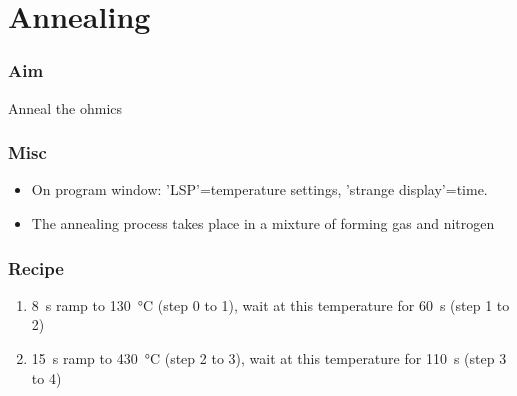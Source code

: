 \documentclass[12pt,a4paper]{report}
\begin{document}
\section{Annealing}
\subsubsection{Aim}
Anneal the ohmics

\subsubsection{Misc}
\begin{itemize}[noitemsep,nolistsep]
\item On program window: 'LSP'=temperature settings, 'strange display'=time.
\item The annealing process takes place in a mixture of forming gas and nitrogen
\end{itemize}

\subsubsection{Recipe}
\begin{enumerate}
\item \SI{8}{\second} ramp to \SI{130}{\degreeCelsius} (step 0 to 1), wait at this temperature for \SI{60}{\second} (step 1 to 2)
\item \SI{15}{\second} ramp to \SI{430}{\degreeCelsius} (step 2 to 3), wait at this temperature for \SI{110}{\second} (step 3 to 4)
\end{enumerate}
\end{document}
